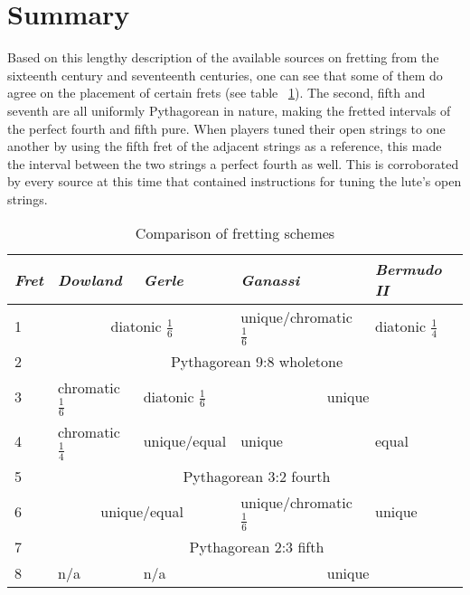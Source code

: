 \section{Summary}
Based on this lengthy description of the available sources on fretting from the sixteenth
century and seventeenth centuries, one can see that some of them do agree on the placement of certain
frets (see table ~\ref{table:comparison}). The second, fifth and seventh are all
uniformly Pythagorean in nature, making the fretted intervals of the perfect fourth and
fifth pure. When players tuned their open strings to one another by using the fifth
fret of the adjacent strings as a reference, this made the interval between the
two strings a perfect fourth as well.  This is corroborated by every source at this
time that contained instructions for tuning the lute's open strings.

\begin{table}[h!]
  \begin{center}
    \begin{tabular}{ l l l l l }
      \textit{Fret} & \textit{Dowland} & \textit{Gerle} & \textit{Ganassi} & \textit{Bermudo II} \\
      \hline
      1 & \multicolumn{2}{|c|}{\cellcolor[gray]{0.9}diatonic $ \frac{1}{6} $} & unique/chromatic $ \frac{1}{6} $ & \cellcolor[gray]{0.9}diatonic $ \frac{1}{4} $ \\
      2 & \multicolumn{4}{|c|}{\cellcolor[gray]{0.9}Pythagorean 9:8 wholetone} \\
      3 & chromatic $ \frac{1}{6} $ & diatonic $ \frac{1}{6} $ & \multicolumn{2}{|c|}{\cellcolor[gray]{0.9}unique} \\
      4 & chromatic $ \frac{1}{4} $ & unique/equal & unique & equal \\
      5 & \multicolumn{4}{|c|}{\cellcolor[gray]{0.9}Pythagorean 3:2 fourth} \\
      6 & \multicolumn{2}{|c|}{\cellcolor[gray]{0.9} unique/equal } & unique/chromatic $ \frac{1}{6} $ & unique \\
      7 & \multicolumn{4}{|c|}{\cellcolor[gray]{0.9}Pythagorean 2:3 fifth} \\
      8 & n/a & n/a & \multicolumn{2}{|c|}{\cellcolor[gray]{0.9}unique} \\
    \end{tabular}
  \end{center}
  \caption{Comparison of fretting schemes}
  \label{table:comparison}
\end{table}

